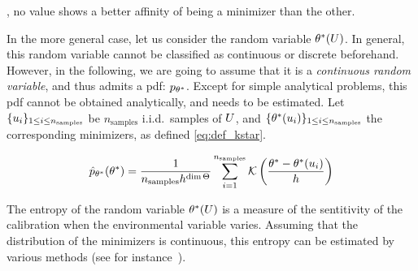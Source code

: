 \makeatletter 
{} 
\makeatother





, no value shows a better affinity of being a minimizer than the other.

In the more general case, let us consider the random variable $\theta^*(U)$. In general, this random variable cannot be classified as continuous or discrete beforehand. However, in the following, we are going to assume that it is a \emph{continuous random variable}, and thus admits a pdf: $p_{\theta^*}$.
Except for simple analytical problems, this pdf cannot be obtained analytically, and needs to be estimated.
Let $\{u_i\}_{1\leq i \leq n_{\mathrm{samples}}}$ be $n_{\mathrm{samples}}$ i.i.d.\ samples of $U$, and
$\{\theta^*(u_i)\}_{1\leq i \leq n_{\mathrm{samples}}}$ the corresponding minimizers, as defined \cref{eq:def_kstar}.

\begin{equation}
  \hat{p}_{\theta^*}(\theta^*) = \frac{1}{n_{\mathrm{samples}} h^{\dim \Theta}} \sum_{i=1}^{n_{\mathrm{samples}}} \mathcal{K}\left(\frac{\theta^* - \theta^*(u_i)}{h}\right)
\end{equation}

The entropy of the random variable $\theta^*(U)$ is a measure of the sentitivity of the calibration when the environmental variable varies.
Assuming that the distribution of the minimizers is continuous, this entropy can be estimated by various methods (see for instance~\cite{beirlant_nonparametric_1997}).








